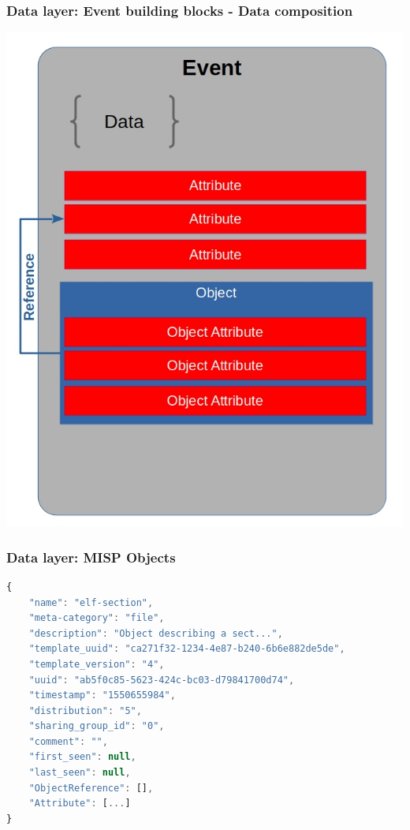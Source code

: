 \begin{frame}
    \frametitle{Data layer: Event building blocks - Data composition}
        \begin{center}
            \includegraphics[scale=0.33]{screenshots/event-building-blocks/event-attribute-object.png}
        \end{center}
\end{frame}

\begin{frame}[fragile]
    \frametitle{Data layer: MISP Objects}
        \begin{lstlisting}[language=javascript,firstnumber=1]
{
    "name": "elf-section",
    "meta-category": "file",
    "description": "Object describing a sect...",
    "template_uuid": "ca271f32-1234-4e87-b240-6b6e882de5de",
    "template_version": "4",
    "uuid": "ab5f0c85-5623-424c-bc03-d79841700d74",
    "timestamp": "1550655984",
    "distribution": "5",
    "sharing_group_id": "0",
    "comment": "",
    "first_seen": null,
    "last_seen": null,
    "ObjectReference": [],
    "Attribute": [...]
}
\end{lstlisting}
\end{frame}

